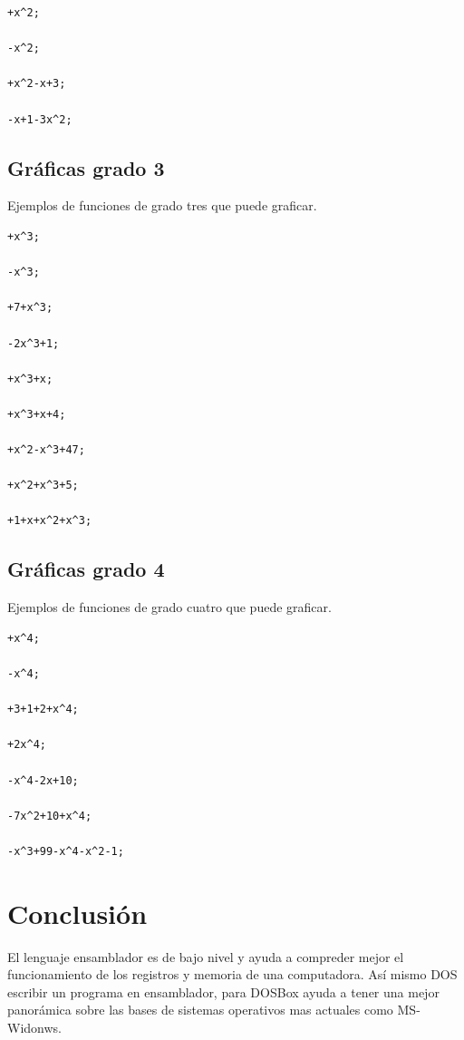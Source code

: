 \documentclass[journal]{../../IEEEtran/IEEEtran}
\begin{document}
\begin{verbatim}
+x^2;

-x^2;

+x^2-x+3;

-x+1-3x^2;

\end{verbatim}

\subsection{Gráficas grado 3}

Ejemplos de funciones de grado tres que puede graficar.
\begin{verbatim}
+x^3;

-x^3;

+7+x^3;

-2x^3+1;

+x^3+x;

+x^3+x+4;

+x^2-x^3+47;

+x^2+x^3+5;

+1+x+x^2+x^3;

\end{verbatim}

\subsection{Gráficas grado 4}

Ejemplos de funciones de grado cuatro que puede graficar.
\begin{verbatim}
+x^4;

-x^4;

+3+1+2+x^4;

+2x^4;

-x^4-2x+10;

-7x^2+10+x^4;

-x^3+99-x^4-x^2-1;

\end{verbatim}

\section{Conclusión}
El lenguaje ensamblador es de bajo nivel y ayuda a compreder mejor el
funcionamiento de los registros y memoria de una computadora. Así
mismo DOS escribir un programa en ensamblador, para DOSBox ayuda a
tener una mejor panorámica sobre las bases de sistemas operativos mas
actuales como MS-Widonws.


\end{document}
